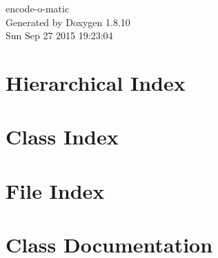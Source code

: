 \documentclass[twoside]{book}
\newcommand{\+}{\discretionary{\mbox{\scriptsize$\hookleftarrow$}}{}{}}
\newcommand{\clearemptydoublepage}{%
  \newpage{\pagestyle{empty}\cleardoublepage}%
}
\begin{document}
\hypersetup{pageanchor=false,
             bookmarks=true,
             bookmarksnumbered=true,
             pdfencoding=unicode
            }
\begin{titlepage}
\vspace*{7cm}
\begin{center}%
{\Large encode-\/o-\/matic }\\
\vspace*{1cm}
{\large Generated by Doxygen 1.8.10}\\
\vspace*{0.5cm}
{\small Sun Sep 27 2015 19:23:04}\\
\end{center}
\end{titlepage}
\clearemptydoublepage
\tableofcontents
\clearemptydoublepage
{}
\hypersetup{pageanchor=true}

\chapter{Hierarchical Index}

\chapter{Class Index}

\chapter{File Index}

\chapter{Class Documentation}






\end{document}
